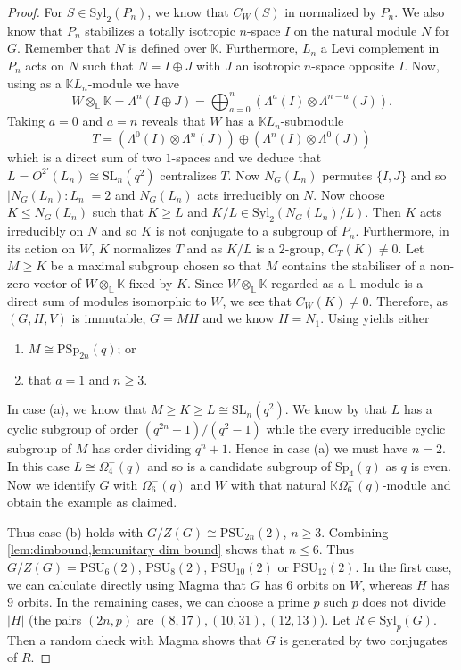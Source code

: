 \documentclass[12pt]{amsart}
\theoremstyle{remark}
\theoremstyle{notation}
\theoremstyle{definition}
\newcommand{\Syl}{\mathrm{Syl}}\newcommand{\syl}{\mathrm{Syl}}
\newcommand{\Sp}{\mathrm{Sp}}
\newcommand{\PSU}{\mathrm{PSU}}
\newcommand{\SL}{\mathrm{SL}}
\newcommand{\0}{\emptyset}
\newcommand{\PSp}{\mathrm{PSp}}
\begin{document}
\begin{proof}
For $S \in \Syl_2(P_n)$, we know that $C_W(S)$ in normalized by $P_n$. We also know that $P_n$ stabilizes a totally isotropic $n$-space $I$ on the natural module $N$ for $G$. Remember that $N$ is defined over $\mathbb K$.  Furthermore, $L_n$ a Levi complement in $P_n$ acts on $N$ such that $N=I\oplus J$ with $J$ an isotropic $n$-space opposite  $I$.  Now, using
\cite[(B.1) in Section B.2, page 473]{FultonHarris} as a $\mathbb K L_n$-module we have
  $$W\otimes _{\mathbb L}\mathbb K= \Lambda^n(I\oplus J)= \bigoplus_{a=0}^n (\Lambda^a (I) \otimes \Lambda^{n-a}(J)).$$  Taking $a=0$ and $a=n$ reveals that $W$ has a $\mathbb KL_n$-submodule
  $$T=(\Lambda^0 (I) \otimes \Lambda^{n}(J))\oplus (\Lambda^n (I) \otimes \Lambda^{0}(J))$$ which is a direct sum of two $1$-spaces and we deduce that $L=O^{2'}(L_n)\cong \SL_n(q^{2})$ centralizes $T$.  Now $N_G(L_n)$ permutes $\{I,J\}$ and so $|N_G(L_n):L_n|=2$ and $N_G(L_n)$ acts irreducibly on $ N$.
Now choose $K\le N_G(L_n)$ such that $K \ge L$ and $K/L \in \syl_2(N_G(L_n)/L)$. Then $K$ acts irreducibly on $N$ and so $K$ is not conjugate to a subgroup of $P_n$.  Furthermore, in its action on $W$, $K $ normalizes $T$ and as $K/L$ is a $2$-group, $C_T(K) \ne 0$.
Let $M \ge K$ be a maximal subgroup chosen so that $M$ contains the stabiliser of a non-zero  vector of $W\otimes _{\mathbb L}\mathbb K$ fixed by $K$. Since $W\otimes _{\mathbb L}\mathbb K$ regarded as a $\mathbb L$-module is a direct sum of modules isomorphic to $W$, we see that $C_W(K) \ne 0$. Therefore, as $(G,H,V)$ is immutable, $G=MH$ and we know $H=N_1$.  Using \cite[Theorem A, Tables 1, 2 \& 3]{LiebeckPraegerSaxl} yields either
\begin{enumerate}
\item [(a)] $M \cong \PSp_{2n}(q)$; or
\item[(b)] that $a=1$ and $n \ge 3$.
\end{enumerate}
In case (a), we know that $M \ge K \ge L \cong \SL_n(q^2)$.
We know by \cite[Satz 1 \& 3]{HuppertSinger} that $L$ has a cyclic subgroup of order $(q^{2n}-1)/(q^2-1)$ while the every irreducible  cyclic subgroup of $M$ has order dividing $q^n+1$. Hence in case (a) we must have $n=2$. In this case $L \cong \Omega_4^-(q)$ and so is a candidate subgroup of $\Sp_4(q)$ as $q$ is even.  Now we identify $G$ with $\Omega_6^-(q)$ and $W$ with that natural $\mathbb K\Omega_6^-(q)$-module and obtain the example as claimed.


Thus case (b) holds with $G/Z(G) \cong \PSU_{2n}(2)$, $n \ge 3$. Combining \cref{lem:dimbound,lem:unitary dim bound} shows that $n \le 6$.  Thus $G/Z(G)=\PSU_6(2)$, $\PSU_8(2)$, $\PSU_{10}(2)$ or $\PSU_{12}(2)$. In the first case, we can calculate directly using {\sc Magma} that $G$ has $6$ orbits on $W$, whereas $H$ has $9$ orbits. In the remaining cases, we can choose a prime $p$ such $p$ does not divide $|H|$ (the pairs $(2n,p)$ are $(8,17), (10,31), (12,13)$). Let $R \in \syl_p(G)$. Then a random check with {\sc Magma} shows that $G$ is generated by two conjugates of $R$.


\end{proof}
\end{document}
